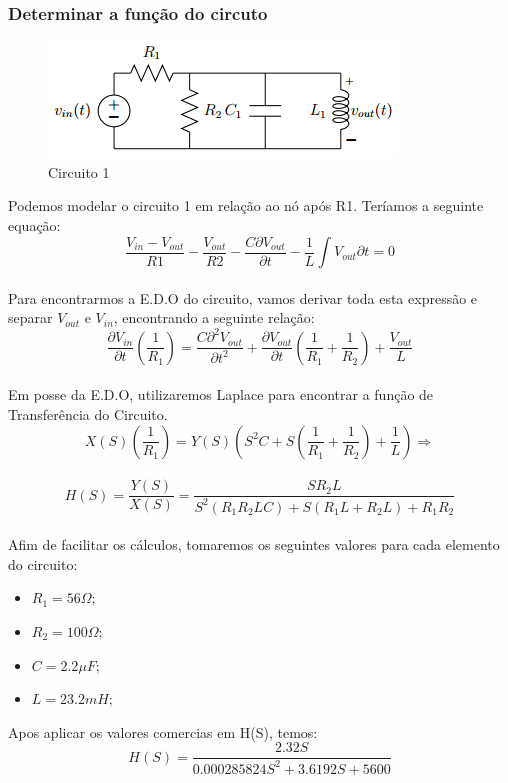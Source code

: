 \documentclass[a4paper, 12pt]{article}
\begin{document}
			\subsubsection{Determinar a função do circuto}
			\begin{figure}[!ht]
				\centering
				\includegraphics{img/circuito1.png}
				\caption{Circuito 1}
			\end{figure}
			Podemos modelar o circuito 1 em relação ao nó após R1. Teríamos a seguinte equação: \\
			\[
				\frac{V_{in} - V_{out}}{R1} - \frac{V_{out}}{R2} - \frac{C\partial V_{out}}{\partial t} - \frac{1}{L} \int V_{out}{\partial t} = 0
			\] 	\\
			Para encontrarmos a E.D.O do circuito, vamos derivar toda esta expressão e separar $V_{out}$ e $V_{in}$, encontrando a seguinte relação:
			\[
				\frac{\partial V_{in}}{\partial t} \left(\frac{1}{R_{1}}\right) = \frac{C \partial^{2} V_{out}}{\partial t^{2}} + \frac{\partial V_{out}}{\partial t} \left(\frac{1}{R_{1}} + \frac{1}{R_{2}} \right) + \frac{V_{out}}{L}
			\] 	\\
			Em posse da E.D.O, utilizaremos Laplace para encontrar a função de Transferência do Circuito.
			\[
				X(S) \left(\frac{1}{R_{1}}\right) = Y(S)\left(S^{2}C + S \left(\frac{1}{R_{1}} + \frac{1}{R_{2}}\right) + \frac{1}{L} \right) \Rightarrow
			\] 	\\
			\[
				H(S) = \frac{Y(S)}{X(S)} = \frac{SR_{2}L}{S^{2}\left(R_{1}R_{2}LC\right) + S\left(R_{1}L + R_{2}L\right) + R_{1}R_{2}}
			\] 	\\

			Afim de facilitar os cálculos, tomaremos os seguintes valores para cada elemento do circuito:
			 \begin{itemize}
				\item $R_{1} = 56 \Omega;$
				\item $R_{2} = 100 \Omega;$
				\item $C = 2.2\mu F;$
				\item $L = 23.2mH;$
			 \end{itemize}

			Apos aplicar os valores comercias em H(S), temos:
			\[
			H(S) = \frac{2.32S}{0.000285824S^{2} + 3.6192S + 5600}
			\] 	\\
\end{document}
